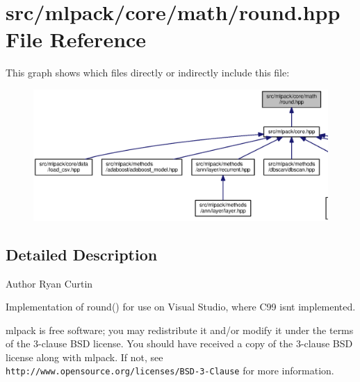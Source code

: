 \section{src/mlpack/core/math/round.hpp File Reference}
\label{round_8hpp}
This graph shows which files directly or indirectly include this file\+:
\nopagebreak
\begin{figure}[H]
\begin{center}
\leavevmode
\includegraphics[width=350pt]{round_8hpp__dep__incl}
\end{center}
\end{figure}


\subsection{Detailed Description}
\begin{DoxyAuthor}{Author}
Ryan Curtin
\end{DoxyAuthor}
Implementation of round() for use on Visual Studio, where C99 isn\textquotesingle{}t implemented.

mlpack is free software; you may redistribute it and/or modify it under the terms of the 3-\/clause B\+SD license. You should have received a copy of the 3-\/clause B\+SD license along with mlpack. If not, see {\tt http\+://www.\+opensource.\+org/licenses/\+B\+S\+D-\/3-\/\+Clause} for more information. 